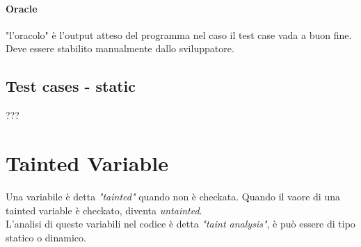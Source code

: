 \documentclass{article}
\begin{document}
\paragraph{Oracle} "l'oracolo" è l'output atteso del programma nel caso il test case vada a buon fine. Deve essere stabilito manualmente dallo sviluppatore.

\subsection{Test cases - static}
???

\section{Tainted Variable}
Una variabile è detta \textit{"tainted"} quando non è checkata. Quando il vaore di una tainted variable è checkato, diventa \textit{untainted}. \\

L'analisi di queste variabili nel codice è detta \textit{"taint analysis"}, è può essere di tipo statico o dinamico.
\end{document}
